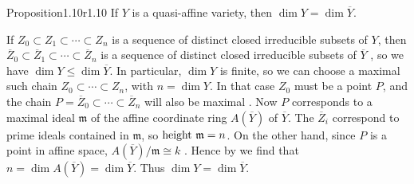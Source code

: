 {\begin{result}{Proposition}{1.10}{r1.10}
If $Y$ is a quasi-affine variety, then $\dim Y=\dim\overline Y$.
\end{result}
\Proof If $Z_0\subset Z_1\subset\cdots\subset Z_n$ is a sequence of distinct closed irreducible subsets of $Y$, then $\overline{Z}_0\subset\overline{Z}_1\subset\cdots\subset\overline{Z}_n$ is a sequence of distinct closed irreducible subsets of $\overline Y$ , so we have $\dim Y\leqslant\dim\overline Y$. In particular, $\dim Y$ is finite, so we can choose a maximal such chain $Z_0\subset\cdots\subset Z_n$, with $n=\dim Y$. In that case $Z_0$ must be a point $P$, and the chain $P=\overline{Z}_0\subset\cdots\subset\overline{Z}_n$ will also be maximal . Now $P$ corresponds to a maximal ideal $\mathfrak m$ of the affine coordinate ring $A(\overline Y)$ of $\overline Y$. The $\overline{Z}_i$ correspond to prime ideals contained in $\mathfrak m$, so $\textup{height }\mathfrak m=n$. On the other hand, since $P$ is a point in affine space, $A(\overline Y)/\mathfrak m\cong k$ . Hence by  we find that $n=\dim A(\overline Y)=\dim\overline Y$. Thus $\dim Y=\dim\overline Y$.
}

